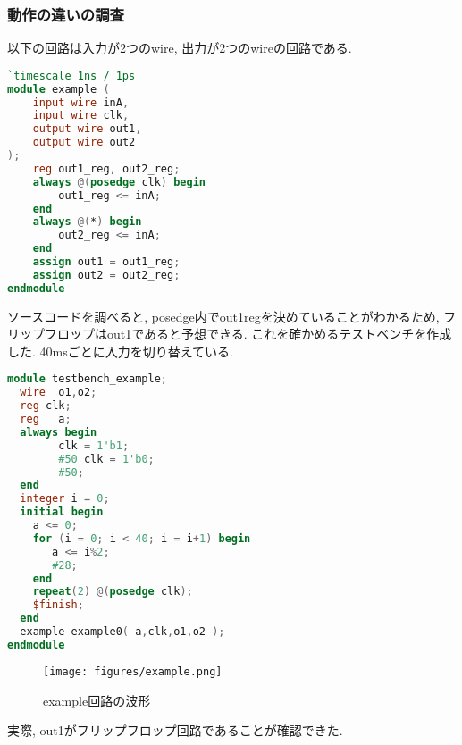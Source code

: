 \documentclass[titlepage]{ltjsarticle}
\begin{document}
\subsubsection{動作の違いの調査}
以下の回路は入力が2つのwire, 出力が2つのwireの回路である. 
\begin{lstlisting}[caption=*****,language=verilog]
`timescale 1ns / 1ps
module example (
    input wire inA,
    input wire clk,
    output wire out1,
    output wire out2
);
    reg out1_reg, out2_reg;
    always @(posedge clk) begin
        out1_reg <= inA;
    end
    always @(*) begin
        out2_reg <= inA;
    end
    assign out1 = out1_reg;
    assign out2 = out2_reg;
endmodule
\end{lstlisting}
ソースコードを調べると, posedge内でout1regを決めていることがわかるため, フリップフロップはout1であると予想できる. これを確かめるテストベンチを作成した. 40msごとに入力を切り替えている. 
\begin{lstlisting}[caption=*****,language=verilog]
module testbench_example;
  wire	o1,o2;
  reg clk;
  reg	a;
  always begin
        clk = 1'b1;
        #50 clk = 1'b0;
        #50;
  end
  integer i = 0;
  initial begin
	a <= 0;
	for (i = 0; i < 40; i = i+1) begin
	   a <= i%2;
	   #28;
	end
	repeat(2) @(posedge clk);
	$finish;
  end
  example example0( a,clk,o1,o2 );
endmodule
\end{lstlisting}
\begin{figure}[H]
    \begin{center}
        \texttt{[image: figures/example.png]}
        \caption{example回路の波形}
    \end{center}
\end{figure}
実際, out1がフリップフロップ回路であることが確認できた. 
\end{document}
